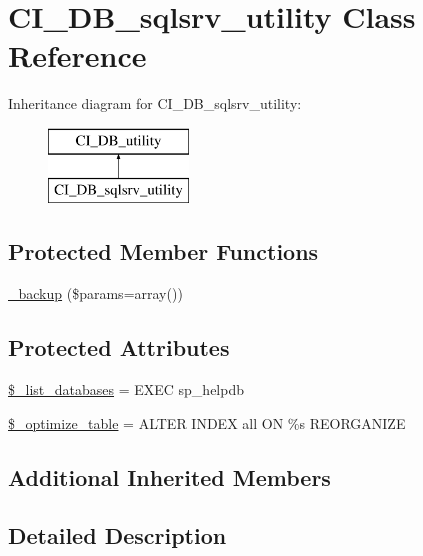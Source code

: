 \hypertarget{class_c_i___d_b__sqlsrv__utility}{}\section{C\+I\+\_\+\+D\+B\+\_\+sqlsrv\+\_\+utility Class Reference}
\label{class_c_i___d_b__sqlsrv__utility}
Inheritance diagram for C\+I\+\_\+\+D\+B\+\_\+sqlsrv\+\_\+utility\+:\begin{figure}[H]
\begin{center}
\leavevmode
\includegraphics[height=2.000000cm]{class_c_i___d_b__sqlsrv__utility}
\end{center}
\end{figure}
\subsection*{Protected Member Functions}
\begin{DoxyCompactItemize}
\item 
\mbox{\hyperlink{class_c_i___d_b__sqlsrv__utility_a30f3053d2c82e7562349924363507afa}{\+\_\+backup}} (\$params=array())
\end{DoxyCompactItemize}
\subsection*{Protected Attributes}
\begin{DoxyCompactItemize}
\item 
\mbox{\hyperlink{class_c_i___d_b__sqlsrv__utility_afe3a5b80562d93d6bc7e2b53c95b7e5a}{\$\+\_\+list\+\_\+databases}} = \textquotesingle{}E\+X\+EC sp\+\_\+helpdb\textquotesingle{}
\item 
\mbox{\hyperlink{class_c_i___d_b__sqlsrv__utility_a083199e5c22c78912dae0a47bb2d7fad}{\$\+\_\+optimize\+\_\+table}} = \textquotesingle{}A\+L\+T\+ER I\+N\+D\+EX all ON \%s R\+E\+O\+R\+G\+A\+N\+I\+ZE\textquotesingle{}
\end{DoxyCompactItemize}
\subsection*{Additional Inherited Members}


\subsection{Detailed Description}


